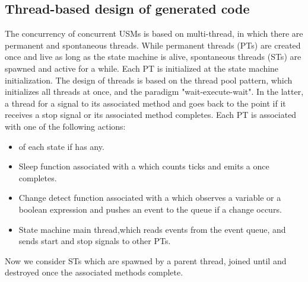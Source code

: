 \subsection{Thread-based design of generated code}
The concurrency of concurrent USMs is based on multi-thread, in which there are permanent and spontaneous threads. 
While permanent threads (PTs) are created once and live as long as the state machine is alive, spontaneous threads (STs) are spawned and active for a while. 
Each PT is initialized at the state machine initialization. 
The design of threads is based on the thread pool pattern, which initializes all threads at once, and the paradigm "wait-execute-wait". 
In the latter, a thread  for a signal to  its associated method and goes back to the  point if it receives a stop signal or its associated method completes. 
Each PT is associated with one of the following actions:
\begin{itemize}
	\item {} of each state if has any. %
	
	\item Sleep function associated with a  which counts ticks and emits a  once completes.%
	
	\item Change detect function associated with a  which observes a variable or a boolean expression and pushes an event to the queue if a change occurs.%
	
	\item State machine main thread,which reads events from the event queue, and sends start and stop signals to other PTs.
\end{itemize} 


Now we consider STs which are spawned by a parent thread, joined until and destroyed once the associated methods complete. 

